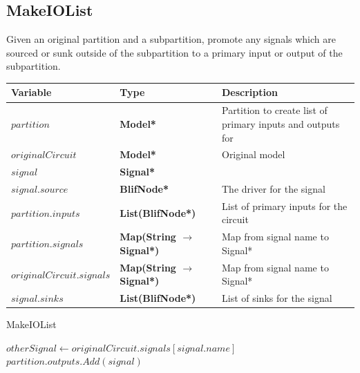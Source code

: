 \documentclass[12pt,final,oneside]{dwThesis} %
\begin{document}
   \subsection{MakeIOList}
   Given an original partition and a subpartition, promote any signals which are sourced or sunk outside of the subpartition to a primary input or output of the subpartition.
   \begin{algorithm}
      \begin{center}
         \begin{tabularx}{\linewidth}{llX}
            \toprule
            Variable & Type & Description\\
            \midrule
            $partition$ &\textbf{  Model* } &  Partition to create list of primary inputs and outputs for\\
            $originalCircuit$ &\textbf{  Model* } &  Original model \\
            $signal$ &\textbf{  Signal* } &  \\
            $signal.source$ &\textbf{  BlifNode* } &  The driver for the signal \\
            $partition.inputs$ &\textbf{  List(BlifNode*) } &  List of primary inputs for the circuit \\
            $partition.signals$ &\textbf{  Map(String $\to$ Signal*) } &  Map from signal name to Signal* \\
            $originalCircuit.signals$ &\textbf{  Map(String $\to$ Signal*) } &  Map from signal name to Signal* \\
            $signal.sinks$ &\textbf{  List(BlifNode*) } &  List of sinks for the signal \\

            \bottomrule
         \end{tabularx}
      \end{center}
      \caption{MakeIOList}\label{makeiolist}
      \begin{algorithmic}[1]
          
         \EndIf
         \State $otherSignal \gets originalCircuit.signals[signal.name]$ 
          
         \State $partition.outputs.Add(signal)$
         \EndIf
         \EndFor
         \EndProcedure
      \end{algorithmic}
   \end{algorithm}
   
\end{document}
